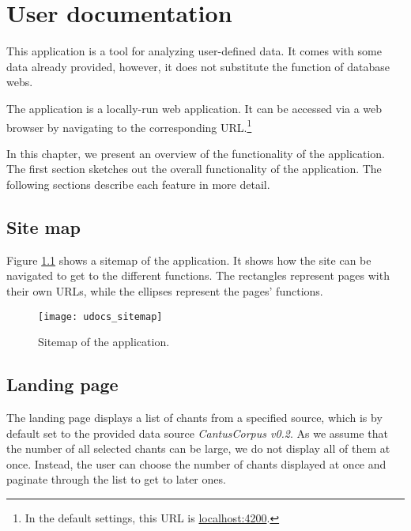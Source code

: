 \chapter{User documentation}


This application is a tool for analyzing user-defined data. It comes with some data already provided, however, it does not substitute the
function of database webs.

The application is a locally-run web application. It can be accessed via a web browser by navigating to the corresponding URL.\footnote{
In the default settings, this URL is \url{localhost:4200}.}

In this chapter, we present an overview of the functionality of the application. The first section sketches out the overall
functionality of the application. The following sections describe each feature in more detail.


\section{Site map}

Figure \ref{fig:sitemap} shows a sitemap of the application. It shows how the site can be navigated to get to the different functions.
The rectangles represent pages with their own URLs, while the ellipses represent the pages' functions.

\begin{figure}[!h]
\centering
\texttt{[image: udocs\_sitemap]}
\caption{Sitemap of the application.}
\label{fig:sitemap}
\end{figure}

\section{Landing page}

The landing page displays a list of chants from a specified source, which is by default set to the provided data source \emph{CantusCorpus v0.2}.
As we assume that the number of all selected chants can be large, we do not display all of them at once. Instead, the user can choose the number of
chants displayed at once and paginate through the list to get to later ones.

